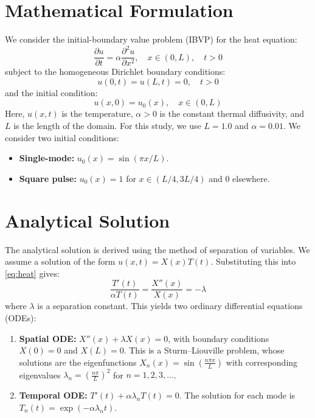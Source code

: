 \documentclass[11pt, a4paper]{article}
\begin{document}
\section{Mathematical Formulation}

We consider the initial-boundary value problem (IBVP) for the heat equation:
\begin{equation}
    \frac{\partial u}{\partial t} = \alpha \frac{\partial^2 u}{\partial x^2}, \quad x \in (0, L), \quad t > 0
    \label{eq:heat}
\end{equation}
subject to the homogeneous Dirichlet boundary conditions:
\begin{equation}
    u(0, t) = u(L, t) = 0, \quad t > 0
    \label{eq:bc}
\end{equation}
and the initial condition:
\begin{equation}
    u(x, 0) = u_0(x), \quad x \in (0, L)
    \label{eq:ic}
\end{equation}
Here, $u(x, t)$ is the temperature, $\alpha > 0$ is the constant thermal diffusivity, and $L$ is the length of the domain. For this study, we use $L = 1.0$ and $\alpha = 0.01$. We consider two initial conditions:
\begin{itemize}
    \item \textbf{Single-mode:} $u_0(x) = \sin(\pi x / L)$.
    \item \textbf{Square pulse:} $u_0(x) = 1$ for $x \in (L/4, 3L/4)$ and $0$ elsewhere.
\end{itemize}

\section{Analytical Solution}

The analytical solution is derived using the method of separation of variables. We assume a solution of the form $u(x, t) = X(x)T(t)$. Substituting this into \eqref{eq:heat} gives:
\[
    \frac{T'(t)}{\alpha T(t)} = \frac{X''(x)}{X(x)} = -\lambda
\]
where $\lambda$ is a separation constant. This yields two ordinary differential equations (ODEs):
\begin{enumerate}
    \item \textbf{Spatial ODE:} $X''(x) + \lambda X(x) = 0$, with boundary conditions $X(0) = 0$ and $X(L) = 0$. This is a Sturm--Liouville problem, whose solutions are the eigenfunctions $X_n(x) = \sin\left(\frac{n\pi x}{L}\right)$ with corresponding eigenvalues $\lambda_n = \left(\frac{n\pi}{L}\right)^2$ for $n = 1, 2, 3, \dots$.
    \item \textbf{Temporal ODE:} $T'(t) + \alpha \lambda_n T(t) = 0$. The solution for each mode is $T_n(t) = \exp(-\alpha \lambda_n t)$.
\end{enumerate}
\end{document}
